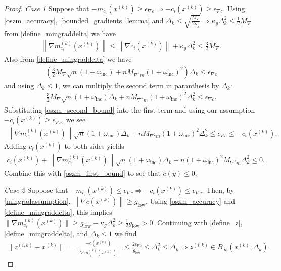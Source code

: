 \documentclass{article}
\theoremstyle{case}
\numberwithin{theorem}{subsection}
\newcommand{\dk}{\Delta_k}
\newcommand{\gmcik}{{\nabla m_{c_i}^{(k)}\left(\xk\right)}}
\newcommand{\maxgrad}{{M_{\nabla}}}
\newcommand{\maxmodelhessian}{{M_{\nabla^2 m}}}
\newcommand{\mingradepsilon}{{\epsilon_{\nabla c}}}
\newcommand{\mingrad}{{ g_{\textrm{low}} }}
\newcommand{\omegainc}{\omega_{\text{inc}}}
\newcommand{\tr}{{ B_{\infty}\left(\xk, \dk\right) }}
\newcommand{\xk}{x^{(k)}}
\newcommand{\zik}{{z^{(i, k)}}}
\begin{document}
\begin{proof}
\emph{Case 1}
Suppose that $-m_{c_i}(\xk) \ge \mingradepsilon \Longrightarrow -c_i(\xk) \ge \mingradepsilon$.
Using \cref{oszm_accuracy}, \cref{bounded_gradients_lemma} and 
$\dk \le \sqrt{\frac {\maxgrad} {2\kappa_g}} \Longrightarrow \kappa_g \dk^2 \le \frac 1 2 \maxgrad$ from \cref{define_mingraddelta} we have
\begin{align}
\label{oszm_second_bound}
\left\| \gmcik \right\| \le \left\|\nabla c_i(\xk)\right\| + \kappa_g \dk^2 \le \frac 3 2 \maxgrad.
\end{align}
Also from \cref{define_mingraddelta} we have
\begin{align*}
\left(\frac 3 2 \maxgrad\sqrt{n} \left(1 + \omegainc\right) + n \maxmodelhessian \left(1 + \omegainc\right)^2 \right)\dk \le \mingradepsilon
\end{align*}
and using $\dk \le 1$, we can multiply the second term in paranthesis by $\dk$:
\begin{align*}
\frac 3 2 \maxgrad\sqrt{n} \left(1 + \omegainc\right) \dk + n \maxmodelhessian \left(1 + \omegainc\right)^2\dk^2 \le \mingradepsilon.
\end{align*}
Substituting \cref{oszm_second_bound} into the first term and using our assumption $-c_i(\xk) \ge \mingradepsilon$, we see
\begin{align*}
\left\|\gmcik\right\|\sqrt{n}\left(1 + \omegainc\right) \dk + n \maxmodelhessian \left(1 + \omegainc\right)^2\dk^2  \le \mingradepsilon \le -c_i(\xk).
\end{align*}
Adding $c_i(\xk)$ to both sides yields
\begin{align*}
c_i(\xk) + \left\|\gmcik\right\|\sqrt{n}\left(1 + \omegainc\right) \dk + n \left(1 + \omegainc\right)^2\maxmodelhessian\dk^2 \le 0.
\end{align*}
Combine this with \cref{oszm_first_bound} to see that $c(y) \le 0$.


\emph{Case 2}
Suppose that $-m_{c_i}(\xk) \le \mingradepsilon \Longrightarrow -c_i(\xk) \le \mingradepsilon$.
Then, by \cref{mingradassumption}, 
$\left\|\nabla c(\xk) \right\| \ge \mingrad$.
Using \cref{oszm_accuracy} and \cref{define_mingraddelta}, this implies
$\|\gmcik\| \ge \mingrad - \kappa_g \dk^2 \ge \frac 1 2 \mingrad > 0$.
Continuing with \cref{define_z}, \cref{define_mingraddelta}, and $\dk \le 1$ we find
\begin{align*}
\|\zik-\xk\| = \frac{-c\left(\xk\right)}{\left\|\gmcik\right\|} \le \frac{2\mingradepsilon}{\mingrad}\le \dk^2 \le \dk \Longrightarrow \zik \in \tr.
\end{align*}
\end{proof}
\end{document}

